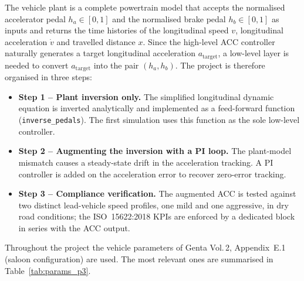 The vehicle plant is a complete powertrain model that accepts the
normalised accelerator pedal $h_a\in[0,1]$ and the normalised brake
pedal $h_b\in[0,1]$ as inputs and returns the time histories of the
longitudinal speed $v$, longitudinal acceleration $\dot v$ and travelled
distance $x$. Since the high-level ACC controller naturally generates
a target longitudinal acceleration $a_\text{target}$, a low-level layer
is needed to convert $a_\text{target}$ into the pair $(h_a,h_b)$. The
project is therefore organised in three steps:
\begin{itemize}
    \item \textbf{Step 1 -- Plant inversion only.} The simplified
          longitudinal dynamic equation is inverted analytically and
          implemented as a feed-forward function
          (\texttt{inverse\_pedals}). The first simulation uses this
          function as the sole low-level controller.
    \item \textbf{Step 2 -- Augmenting the inversion with a PI loop.}
          The plant-model mismatch causes a steady-state drift in the
          acceleration tracking. A PI controller is added on the
          acceleration error to recover zero-error tracking.
    \item \textbf{Step 3 -- Compliance verification.} The augmented
          ACC is tested against two distinct lead-vehicle speed
          profiles, one mild and one aggressive, in dry road
          conditions; the ISO~15622:2018 KPIs are enforced by a
          dedicated block in series with the ACC output.
\end{itemize}

Throughout the project the vehicle parameters of Genta Vol.\,2,
Appendix~E.1 (saloon configuration) are used. The most relevant ones
are summarised in Table~\ref{tab:params_p3}.


